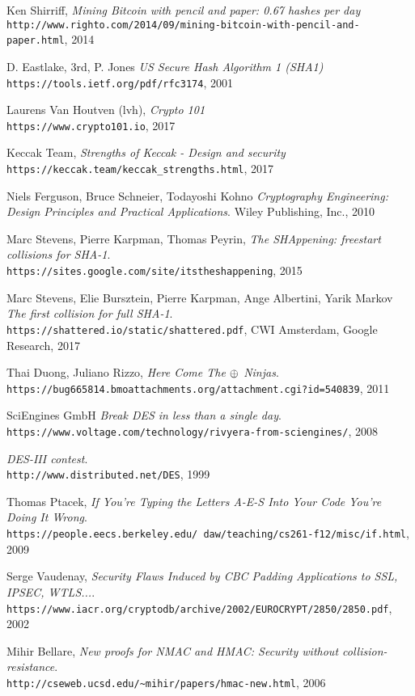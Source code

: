 \begin{thebibliography}{9}
Ken Shirriff,
\textit{Mining Bitcoin with pencil and paper: 0.67 hashes per day} \\ 
\texttt{http://www.righto.com/2014/09/mining-bitcoin-with-pencil-and-paper.html}, 2014

D. Eastlake, 3rd, P. Jones
\textit{US Secure Hash Algorithm 1 (SHA1)} \\ 
\texttt{https://tools.ietf.org/pdf/rfc3174}, 2001

Laurens Van Houtven (lvh),
\textit{Crypto 101} \\ 
\texttt{https://www.crypto101.io}, 2017

Keccak Team,
\textit{Strengths of Keccak - Design and security} \\ 
\texttt{https://keccak.team/keccak\_strengths.html}, 2017

Niels Ferguson, Bruce Schneier, Todayoshi Kohno
\textit{Cryptography Engineering: Design Principles and Practical Applications}. Wiley Publishing, Inc., 2010

Marc Stevens, Pierre Karpman, Thomas Peyrin,
\textit{The SHAppening: freestart collisions for SHA-1}. \\
\texttt{https://sites.google.com/site/itstheshappening}, 2015

Marc Stevens, Elie Bursztein, Pierre Karpman, Ange Albertini, Yarik Markov
\textit{The first collision for full SHA-1}. \\
\texttt{https://shattered.io/static/shattered.pdf}, CWI Amsterdam, Google Research, 2017

Thai Duong, Juliano Rizzo, 
\textit{Here Come The $\mathbin{\oplus}$ Ninjas}. \\
\texttt{https://bug665814.bmoattachments.org/attachment.cgi?id=540839}, 2011

SciEngines GmbH
\textit{Break DES in less than a single day}. \\
\texttt{https://www.voltage.com/technology/rivyera-from-sciengines/}, 2008

\textit{DES-III contest}. \\
\texttt{http://www.distributed.net/DES}, 1999

Thomas Ptacek, 
\textit{If You’re Typing the Letters A-E-S Into Your Code You’re Doing It Wrong}. \\
\texttt{https://people.eecs.berkeley.edu/~daw/teaching/cs261-f12/misc/if.html}, 2009

Serge Vaudenay,
\textit{Security Flaws Induced by CBC Padding Applications to SSL, IPSEC, WTLS...}. \\
\texttt{https://www.iacr.org/cryptodb/archive/2002/EUROCRYPT/2850/2850.pdf}, 2002

Mihir Bellare,
\textit{New proofs for NMAC and HMAC: Security without collision-resistance}. \\
\texttt{http://cseweb.ucsd.edu/\textasciitilde mihir/papers/hmac-new.html}, 2006

\end{thebibliography}